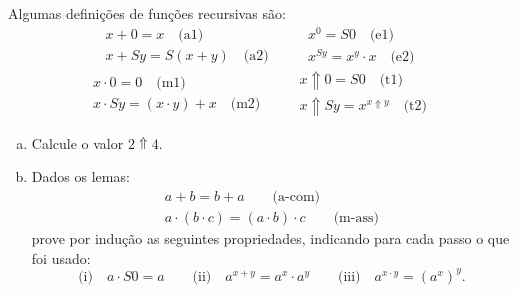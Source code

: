 \begin{exercise}
	Algumas definições de funções recursivas são:
	$$
		\left.
			\begin{aligned}
				x + 0 = x \quad \text{(a1)}\\
				x + Sy = S(x + y) \quad \text {(a2)}
			\end{aligned}
		\right.
		\qquad
		\left.
			\begin{aligned}
				x^0 = S0 \quad \text{(e1)}\\
				x^{Sy} = x^y \cdot x \quad \text{(e2)}
			\end{aligned}
		\right.
	$$
	$$
		\left.
			\begin{aligned}
				x \cdot 0 = 0 \quad \text{(m1)}\\
				x \cdot Sy = (x \cdot y) + x \quad \text{(m2)}
			\end{aligned}
		\right.
		\qquad
		\left.
			\begin{aligned}
				x \Uparrow 0 = S0 \quad \text{(t1)}\\
				x \Uparrow Sy = x^{x \Uparrow y} \quad \text{(t2)}
			\end{aligned}
		\right.
	$$

	\begin{enumerate}[(a)]
		\item Calcule o valor $ 2 \Uparrow 4 $.
		\item Dados os lemas:
			$$
				\left.
					\begin{aligned}
						a + b = b + a \qquad \text{(a-com)}\\
						a \cdot (b \cdot c) = (a \cdot b) \cdot c \qquad \text{(m-ass)}
					\end{aligned}
				\right.
			$$
		prove por indução as seguintes propriedades, indicando para cada passo o que foi usado:
			$$
				\text{(i)}
					\quad a \cdot S0 = a
				\qquad
				\text{(ii)}
					\quad a^{x + y} = a^x \cdot a^y
				\qquad
				\text{(iii)}
					\quad a^{x \cdot y} = (a^x)^{y}.
			$$
	\end{enumerate}
\end{exercise}

